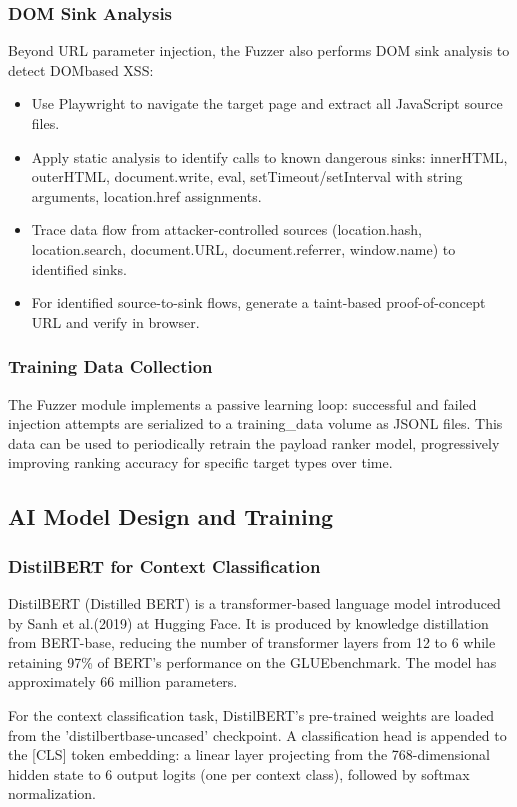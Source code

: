 \subsubsection{DOM Sink Analysis}
Beyond URL parameter injection, the Fuzzer also performs DOM sink analysis to detect DOMbased XSS:

\begin{itemize}
    \item Use Playwright to navigate the target page and extract all JavaScript source files.
    \item Apply static analysis to identify calls to known dangerous sinks: innerHTML, outerHTML, document.write, eval, setTimeout/setInterval with string arguments, location.href assignments.
    \item Trace data flow from attacker-controlled sources (location.hash, location.search, document.URL, document.referrer, window.name) to identified sinks.
    \item For identified source-to-sink flows, generate a taint-based proof-of-concept URL and verify in browser.
\end{itemize}
\subsubsection{Training Data Collection}
The Fuzzer module implements a passive learning loop: successful and failed injection attempts are serialized to a training\_\allowbreak data volume as JSONL files. This data can be used to periodically retrain the payload ranker model, progressively improving ranking accuracy for specific target types over time.

\subsection{AI Model Design and Training}
\subsubsection{DistilBERT for Context Classification}
DistilBERT (Distilled BERT) is a transformer-based language model introduced by Sanh et al.(2019) at Hugging Face\cite{sanh2019distilbert}. It is produced by knowledge distillation from BERT-base, reducing the number of transformer layers from 12 to 6 while retaining 97\% of BERT's performance on the GLUEbenchmark. The model has approximately 66 million parameters.

For the context classification task, DistilBERT's pre-trained weights are loaded from the 'distilbertbase-uncased' checkpoint. A classification head is appended to the [CLS] token embedding: a linear layer projecting from the 768-dimensional hidden state to 6 output logits (one per context class), followed by softmax normalization.

